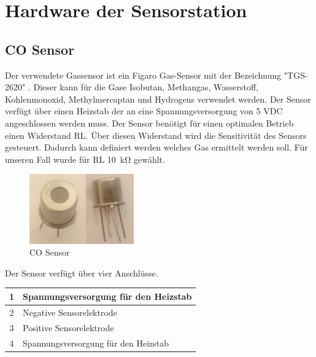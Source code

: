 \documentclass{article}
\begin{document}
\newpage

\section{Hardware der Sensorstation}
\subsection{CO Sensor}
Der verwendete Gassensor ist ein Figaro Gas-Sensor mit der Bezeichnung "TGS-2620" \cite{figaro-gas-sensor}.
Dieser kann für die Gase Isobutan, Methangas, Wasserstoff, Kohlenmonoxid, Methylmercaptan und Hydrogens verwendet werden.
Der Sensor verfügt über einen Heizstab der an eine Spannungsversorgung von 5 VDC angeschlossen werden muss.
Der Sensor benötigt für einen optimalen Betrieb einen Widerstand RL.
Über diesen Widerstand wird die Sensitivität des Sensors gesteuert.
Dadurch kann definiert werden welches Gas ermittelt werden soll.
Für unseren Fall wurde für RL \SI{10}{\kilo\ohm} gewählt.\\

\begin{figure}[h]
 \centering
 \includegraphics[height=3cm]{images/CO_Sensor.JPG}
 \caption{CO Sensor}
 \label{fig:co_sensor}
\end{figure}

Der Sensor verfügt über vier Anschlüsse.
\begin{center}
\begin{tabular}{|c|p{}|}
    \hline
    1 & Spannungsversorgung für den Heizstab \\ \hline
    2 & Negative Sensorelektrode \\ \hline
    3 & Positive Sensorelektrode\\ \hline
    4 & Spannungsversorgung für den Heizstab\\ \hline
\end{tabular}
\end{center}
\end{document}
